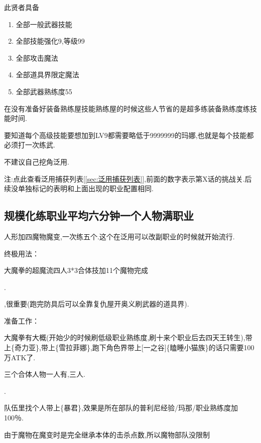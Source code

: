 		此贤者具备
		\begin{enumerate}
			\item 全部一般武器技能
			\item 全部技能强化9,等级99
			\item 全部攻击魔法
			\item 全部道具界限定魔法
			\item 全部武器熟练度55
		\end{enumerate}
		
		在没有准备好装备熟练屋技能熟练屋的时候这些人节省的是超多练装备熟练度练技能时间.

		要知道每个高级技能要想加到LV9都需要略低于9999999的玛娜,也就是每个技能都必须打一次练武.

		不建议自己挖角泛用.

		注:点此查看泛用捕获列表[\ref{sec:泛用捕获列表}],前面的数字表示第X话的挑战关.后续没单独标记的表明和上面出现的职业配置相同.

	\newpage

		\subsection{规模化练职业平均六分钟一个人物满职业}

		人形加四魔物魔变,一次练五个.这个在泛用可以改副职业的时候就开始流行.

		终极用法：

		大魔拳的超魔流四人3*3合体技加11个魔物完成

		{\color{red}{修罗巴尔必备杰洛肯,有男主最好,需要大量千万级能力角色,所以这步可视为修罗巴尔攻略的必经之路}}.

		{\color{red}{记得练上魔女和兔兔莉亚,同步探索魔界收集41武器}},很重要(跑完防具后可以全靠复仇屋开奥义刷武器的道具界).

		准备工作：

		大魔拳有大概{\color{red}{200万能力}}(开始少的时候刷低级职业熟练度,刷十来个职业后去四天王转生),带上{\color{red}{[可靠的伙伴]}}\{奇力亚\},带上{\color{red}{生杀予夺}}\{雪拉菲娜\},跑下角色界带上[一之谷]\{瞌睡小猫族\}的话只需要100万ATK了.

		三个合体人物一人有{},三人{}.

		{\color{red}{四人放到普利尼部队}}.

		队伍里找个人带上{\color{red}{普利尼教育员}}\{暴君\},效果是所在部队的普利尼经验/玛那/职业熟练度加100％.

		由于魔物在魔变时是完全继承本体的击杀点数,所以魔物部队没限制

